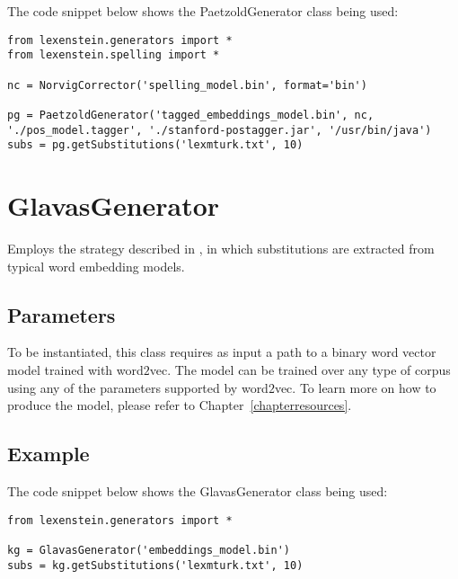 The code snippet below shows the PaetzoldGenerator class being used:

\begin{lstlisting}
from lexenstein.generators import *
from lexenstein.spelling import *

nc = NorvigCorrector('spelling_model.bin', format='bin')

pg = PaetzoldGenerator('tagged_embeddings_model.bin', nc, './pos_model.tagger', './stanford-postagger.jar', '/usr/bin/java')
subs = pg.getSubstitutions('lexmturk.txt', 10)
\end{lstlisting}











\section{GlavasGenerator}

Employs the strategy described in \cite{glavas2015}, in which substitutions are extracted from typical word embedding models.

\subsection{Parameters}

To be instantiated, this class requires as input a path to a binary word vector model trained with word$2$vec. The model can be trained over any type of corpus using any of the parameters supported by word$2$vec. To learn more on how to produce the model, please refer to Chapter~\ref{chapterresources}.



\subsection{Example}

The code snippet below shows the GlavasGenerator class being used:

\begin{lstlisting}
from lexenstein.generators import *

kg = GlavasGenerator('embeddings_model.bin')
subs = kg.getSubstitutions('lexmturk.txt', 10)
\end{lstlisting}













